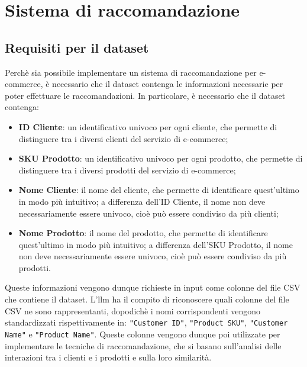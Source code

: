 \chapter{Sistema di raccomandazione}
\label{cap:sistema-raccomandazione}


\section{Requisiti per il dataset}

Perchè sia possibile implementare un sistema di raccomandazione per e-commerce, è necessario che il dataset contenga le informazioni necessarie per poter effettuare le raccomandazioni. In particolare, è necessario che il dataset contenga:
\begin{itemize}
    \item \textbf{ID Cliente}: un identificativo univoco per ogni cliente, che permette di distinguere tra i diversi clienti del servizio di e-commerce;
    \item \textbf{SKU Prodotto}: un identificativo univoco per ogni prodotto, che permette di distinguere tra i diversi prodotti del servizio di e-commerce;
    \item \textbf{Nome Cliente}: il nome del cliente, che permette di identificare quest'ultimo in modo più intuitivo; a differenza dell'ID Cliente, il nome non deve necessariamente essere univoco, cioè può essere condiviso da più clienti;
    \item \textbf{Nome Prodotto}: il nome del prodotto, che permette di identificare quest'ultimo in modo più intuitivo; a differenza dell'SKU Prodotto, il nome non deve necessariamente essere univoco, cioè può essere condiviso da più prodotti.
\end{itemize}

Queste informazioni vengono dunque richieste in input come colonne del file CSV che contiene il dataset. L'\gls{llm} ha il compito di riconoscere quali colonne del file CSV ne sono rappresentanti, dopodichè i nomi corrispondenti vengono standardizzati rispettivamente in: \texttt{"Customer ID"}, \texttt{"Product SKU"}, \texttt{"Customer Name"} e \texttt{"Product Name"}. Queste colonne vengono dunque poi utilizzate per implementare le tecniche di raccomandazione, che si basano sull'analisi delle interazioni tra i clienti e i prodotti e sulla loro similarità.

